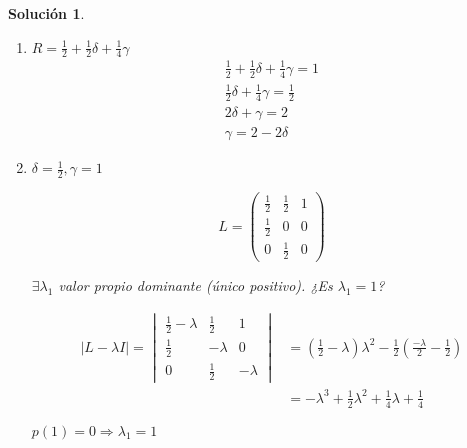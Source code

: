 \documentclass[11pt, a4paper]{article}
\newif\IfInSansMode
\numberwithin{equation}{section}
\theoremstyle{theorem-style}
\theoremstyle{definition-style}
\theoremstyle{remark-style}
\newtheorem*{sol}{Solución}
\theoremstyle{example-style}
\begin{document}
\begin{sol}\hfill
    \begin{enumerate}[label=\alph*)]        
        \item $R = \frac{1}{2} + \frac{1}{2}\delta + \frac{1}{4}\gamma$
            \begin{align*}
                \label{}
                \frac{1}{2} + \frac{1}{2}\delta + \frac{1}{4}\gamma = 1 \\
                \frac{1}{2}\delta + \frac{1}{4}\gamma = \frac{1}{2} \\
                2\delta + \gamma = 2 \\
                \gamma = 2 - 2\delta
            \end{align*}
        \item $\delta = \frac{1}{2}, \gamma = 1$

            $$L = \begin{pmatrix}
                \frac{1}{2} & \frac{1}{2} & 1 \\
                \frac{1}{2} & 0 & 0 \\
                0 & \frac{1}{2} & 0
            \end{pmatrix}$$

            $\exists \lambda_1$ valor propio dominante (único positivo). ¿Es $\lambda_1 = 1$?

            \begin{align*}
                \label{}
                |L-\lambda I| = \begin{vmatrix}
                    \frac{1}{2} - \lambda & \frac{1}{2} & 1 \\
                    \frac{1}{2} & -\lambda & 0 \\
                    0 & \frac{1}{2} & -\lambda
                \end{vmatrix} &= \left( \frac{1}{2} - \lambda \right)\lambda^2 - \frac{1}{2}\left( \frac{-\lambda}{2} - \frac{1}{2} \right) \\
                              &= -\lambda^3 + \frac{1}{2}\lambda^2 + \frac{1}{4}\lambda + \frac{1}{4}
            \end{align*}
        
            $p(1) = 0 \Rightarrow \lambda_1 = 1$


\end{enumerate}
\end{sol}
\end{document}
